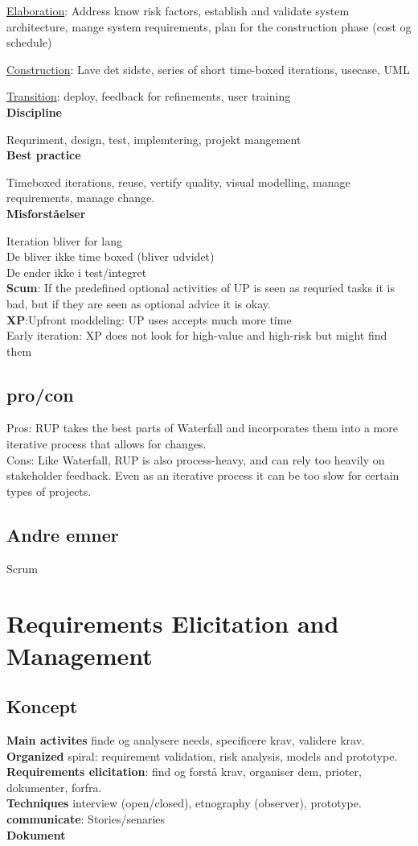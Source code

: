 \documentclass[11pt,a4paper]{article}
\begin{document}
\underline{Elaboration}: Address know risk factors, establish and validate system architecture, mange system requirements, plan for the construction phase (cost og schedule)
 
\underline{Construction}: Lave det sidste, series of short time-boxed iterations, usecase, UML

\underline{Transition}: deploy, feedback for refinements, user training\\
\textbf{Discipline}

Requriment, design, test, implemtering, projekt mangement\\
\textbf{Best practice}

Timeboxed iterations, reuse, vertify quality, visual modelling, manage requirements, manage change.\\
\textbf{Misforståelser}

Iteration bliver for lang\\
De bliver ikke time boxed (bliver udvidet)\\
De ender ikke i test/integret\\
\textbf{Scum}: If the predefined optional activities of UP is seen as requried tasks it is bad, but if they are seen as optional advice it is okay.\\
\textbf{XP}:Upfront moddeling: UP uses accepts much more time\\
Early iteration: XP does not look for high-value and high-risk but might find them\\
\subsection{pro/con}
Pros: RUP takes the best parts of Waterfall and incorporates them into a more iterative process that allows for changes.\\
Cons: Like Waterfall, RUP is also process-heavy, and can rely too heavily on stakeholder feedback. Even as an iterative process it can be too slow for certain types of projects.
\subsection{Andre emner}
Scrum
\newpage
\section{Requirements Elicitation and Management}
\subsection{Koncept}
\textbf{Main activites} finde og analysere needs, specificere krav, validere krav.\\
\textbf{Organized} spiral: requirement validation, risk analysis, models and prototype.\\
\textbf{Requirements elicitation}: find og forstå krav, organiser dem, prioter, dokumenter, forfra.\\
\textbf{Techniques} interview (open/closed), etnography (observer), prototype.\\
\textbf{communicate}: Stories/senaries\\
\textbf{Dokument}
\end{document}
